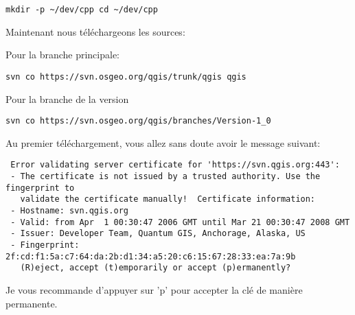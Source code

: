 \begin{verbatim}
mkdir -p ~/dev/cpp cd ~/dev/cpp 
\end{verbatim}

Maintenant nous téléchargeons les sources:

Pour la branche principale:

\begin{verbatim}
svn co https://svn.osgeo.org/qgis/trunk/qgis qgis 
\end{verbatim}

Pour la branche de la version 

\begin{verbatim}
svn co https://svn.osgeo.org/qgis/branches/Version-1_0
\end{verbatim}

Au premier téléchargement, vous allez sans doute avoir le message suivant:

\begin{verbatim}
 Error validating server certificate for 'https://svn.qgis.org:443':
 - The certificate is not issued by a trusted authority. Use the fingerprint to
   validate the certificate manually!  Certificate information:
 - Hostname: svn.qgis.org
 - Valid: from Apr  1 00:30:47 2006 GMT until Mar 21 00:30:47 2008 GMT
 - Issuer: Developer Team, Quantum GIS, Anchorage, Alaska, US
 - Fingerprint: 2f:cd:f1:5a:c7:64:da:2b:d1:34:a5:20:c6:15:67:28:33:ea:7a:9b
   (R)eject, accept (t)emporarily or accept (p)ermanently?  
\end{verbatim}

Je vous recommande d'appuyer sur 'p' pour accepter la clé de manière permanente.

